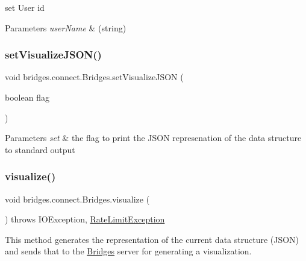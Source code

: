 set User id


\begin{DoxyParams}{Parameters}
{\em user\+Name} & (string) \\
\hline
\end{DoxyParams}
\mbox{\label{classbridges_1_1connect_1_1_bridges_aa502aa32a9ac482da9c8455c6810b64d}} 
\subsubsection{\texorpdfstring{set\+Visualize\+J\+S\+O\+N()}{setVisualizeJSON()}}
{\footnotesize\ttfamily void bridges.\+connect.\+Bridges.\+set\+Visualize\+J\+S\+ON (\begin{DoxyParamCaption}\item[{boolean}]{flag }\end{DoxyParamCaption})}


\begin{DoxyParams}{Parameters}
{\em set} & the flag to print the J\+S\+ON represenation of the data structure to standard output \\
\hline
\end{DoxyParams}
\mbox{\label{classbridges_1_1connect_1_1_bridges_a1853d64ffb8675ba2ec227a2b819cd24}} 
\subsubsection{\texorpdfstring{visualize()}{visualize()}}
{\footnotesize\ttfamily void bridges.\+connect.\+Bridges.\+visualize (\begin{DoxyParamCaption}{ }\end{DoxyParamCaption}) throws I\+O\+Exception, \mbox{\hyperlink{classbridges_1_1validation_1_1_rate_limit_exception}{Rate\+Limit\+Exception}}}

This method generates the representation of the current data structure (J\+S\+ON) and sends that to the \mbox{\hyperlink{classbridges_1_1connect_1_1_bridges}{Bridges}} server for generating a visualization.



